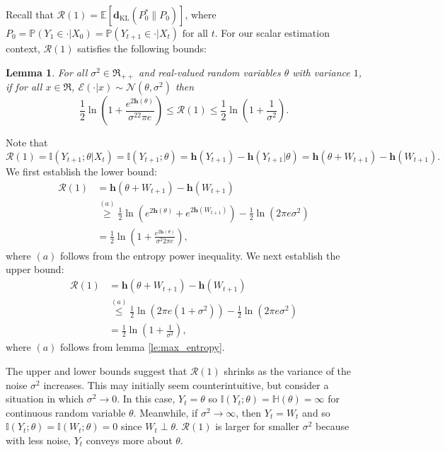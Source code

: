 \documentclass[twoside,11pt]{article}
\renewenvironment{proof}{\par\noindent{\bf Proof\ }}{\hfill\BlackBox\\[2mm]}
\newenvironment{proof}{\par\noindent{\bf Proof\ }}{\hfill\BlackBox\\[2mm]}
\newtheorem{lemma}[theorem]{Lemma}
\def\environment{\mathcal{E}}
\def\regret{\mathcal{R}}
\def\KL{\mathbf{d}_{\mathrm{KL}}}
\def\diffentropy{\bf h}
\def\E{\mathbb{E}}
\def\H{\mathbb{H}}
\def\diffentropy{\mathbf{h}}
\def\I{\mathbb{I}}
\def\Pr{\mathbb{P}}
\begin{document}
Recall that $\regret(1) = \E[\KL(P^*_0 \| P_0)]$, where $P_0 = \Pr(Y_1 \in \cdot | X_0) = \Pr(Y_{t+1}\in\cdot|X_t) \text{ for all } t$.  For our scalar estimation context, $\regret(1)$ satisfies the following bounds:
\begin{lemma}
    \label{le:scalar-estimation-regret}
    For all $\sigma^2 \in \Re_{++}$ and real-valued random variables $\theta$ with variance $1$, if for all $x\in \Re$, $\environment(\cdot|x)\sim \mathcal{N}(\theta, \sigma^2)$ then
    $$ \frac{1}{2}\ln\left(1 + \frac{e^{2\diffentropy(\theta)}}{\sigma^22\pi e}\right) \leq \regret(1) \leq \frac{1}{2}\ln\left(1 + \frac{1}{\sigma^2}\right).$$
\end{lemma}
\begin{proof}
    Note that
    $$\regret(1) = \I(Y_{t+1};\theta|X_t) = \I(Y_{t+1};\theta) = \diffentropy(Y_{t+1}) - \diffentropy(Y_{t+1}|\theta) = \diffentropy(\theta+W_{t+1}) - \diffentropy(W_{t+1}).$$
    We first establish the lower bound:
    \begin{align*}
        \regret(1)
        & = \diffentropy(\theta + W_{t+1}) - \diffentropy(W_{t+1})\\
        & \overset{(a)}{\geq} \frac{1}{2}\ln\left(e^{2\diffentropy(\theta)} + e^{2\diffentropy(W_{t+1})}\right) - \frac{1}{2}\ln\left(2\pi e \sigma^2\right)\\
        & = \frac{1}{2}\ln\left(1 + \frac{e^{2\diffentropy(\theta)}}{\sigma^2 2\pi e}\right),
    \end{align*}
    where $(a)$ follows from the entropy power inequality.  We next establish the upper bound:
    \begin{align*}
    \regret(1)
    & =  \diffentropy(\theta + W_{t+1}) - \diffentropy(W_{t+1})\\
    & \overset{(a)}{\leq} \frac{1}{2}\ln\left(2\pi e (1 + \sigma^2)\right) - \frac{1}{2}\ln\left(2\pi e \sigma^2\right)\\
    & = \frac{1}{2}\ln\left(1 + \frac{1}{\sigma^2}\right),
    \end{align*}
    where $(a)$ follows from lemma \ref{le:max_entropy}.
\end{proof}

The upper and lower bounds suggest that $\regret(1)$ shrinks as the variance of the noise $\sigma^2$ increases. This may initially seem counterintuitive, but consider a situation in which $\sigma^2 \rightarrow 0$. In this case, $Y_{t} = \theta$ so $\I(Y_t;\theta) = \H(\theta) = \infty$ for continuous random variable $\theta$. Meanwhile, if $\sigma^2 \rightarrow \infty$, then $Y_t = W_t$ and so $\I(Y_t;\theta) = \I(W_t;\theta) = 0$ since $W_t \perp \theta$. $\regret(1)$ is larger for smaller $\sigma^2$ because with less noise, $Y_t$ conveys more about $\theta$.
\end{document}
